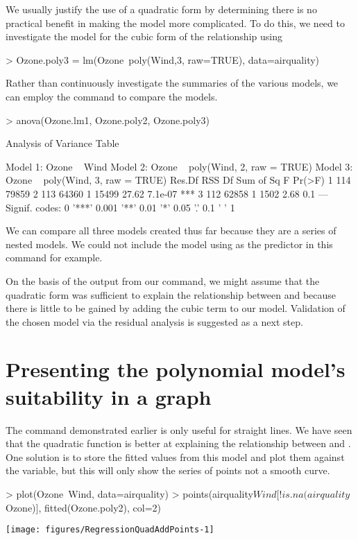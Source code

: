 We usually justify the use of a quadratic form by determining there is no practical benefit in making the model more complicated. To do this, we need to investigate the model for the cubic form of the relationship using
\begin{Schunk}
\begin{Sinput}
> Ozone.poly3 = lm(Ozone~poly(Wind,3, raw=TRUE), data=airquality)
\end{Sinput}
\end{Schunk}
Rather than continuously investigate the summaries of the various models, we can employ the  command to compare the models. 
\begin{Schunk}
\begin{Sinput}
> anova(Ozone.lm1, Ozone.poly2, Ozone.poly3)
\end{Sinput}
\begin{Soutput}
Analysis of Variance Table

Model 1: Ozone ~ Wind
Model 2: Ozone ~ poly(Wind, 2, raw = TRUE)
Model 3: Ozone ~ poly(Wind, 3, raw = TRUE)
  Res.Df   RSS Df Sum of Sq     F  Pr(>F)    
1    114 79859                               
2    113 64360  1     15499 27.62 7.1e-07 ***
3    112 62858  1      1502  2.68     0.1    
---
Signif. codes:  
0 '***' 0.001 '**' 0.01 '*' 0.05 '.' 0.1 ' ' 1
\end{Soutput}
\end{Schunk}
We can compare all three models created thus far because they are a series of nested models. We could not include the model using  as the predictor in this command for example.

On the basis of the output from our  command, we might assume that the quadratic form was sufficient to explain the relationship between  and  because there is little to be gained by adding the cubic term to our model. Validation of the chosen model via the residual analysis is suggested as a next step.

\section{Presenting the polynomial model's suitability in a graph}

The  command demonstrated earlier is only useful for straight lines. We have seen that the quadratic function is better at explaining the relationship between  and . One solution is to store the fitted values from this model and plot them against the  variable, but this will only show the series of points not a smooth curve. 
\begin{Schunk}
\begin{Sinput}
> plot(Ozone~Wind, data=airquality)
> points(airquality$Wind[!is.na(airquality$Ozone)], fitted(Ozone.poly2), col=2)
\end{Sinput}

\texttt{[image: figures/RegressionQuadAddPoints-1]} \end{Schunk}

